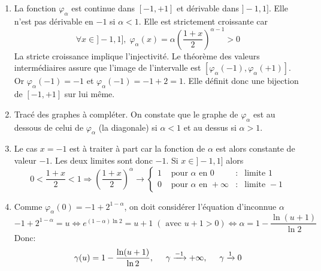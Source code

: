 \begin{enumerate}
  \item La fonction $\varphi_\alpha$ est continue dans $[-1,+1]$ et dérivable dans $]-1,1]$. Elle n'est pas dérivable en $-1$ si $\alpha <1$. Elle est strictement croissante car
\begin{displaymath}
  \forall x\in ]-1,1],\; \varphi_\alpha(x) = \alpha \left( \frac{1+x}{2}\right)^{\alpha -1} > 0
\end{displaymath}
La stricte croissance implique l'injectivité. Le théorème des valeurs intermédiaires assure que l'image de l'intervalle est $[\varphi_\alpha(-1), \varphi_\alpha(+1)]$. Or $\varphi_\alpha(-1)=-1$ et $\varphi_\alpha(-1)=-1+2=1$. Elle définit donc une bijection de $[-1,+1]$ sur lui même.

  \item Tracé des graphes à compléter. On constate que le graphe de $\varphi_\alpha$ est au dessous de celui de $\varphi_\alpha$ (la diagonale) si $\alpha<1$ et au dessus si $\alpha >1$.
  
  \item Le cas $x=-1$ est à traiter à part car la fonction de $\alpha$ est alors constante de valeur $-1$. Les deux limites sont donc $-1$.\newline
Si $x\in ]-1,1]$ alors
\begin{displaymath}
  0<\frac{1+x}{2} < 1 \Rightarrow \left( \frac{1+x}{2}\right)^{\alpha} \rightarrow
\left\lbrace 
\begin{aligned}
  1 &\text{ pour $\alpha$ en } 0       &: &\text{limite } 1\\
  0 &\text{ pour $\alpha$ en } +\infty &: &\text{limite } -1
\end{aligned}
\right. 
\end{displaymath}

  \item Comme $\varphi_\alpha(0)= -1 + 2^{1-\alpha}$, on doit considérer l'équation d'inconnue $\alpha$
\begin{displaymath}
  -1 + 2^{1-\alpha} = u \Leftrightarrow e^{(1-\alpha)\ln 2} = u + 1 \;\left( \text{ avec } u+1>0\right) 
\Leftrightarrow \alpha = 1 - \frac{\ln(u+1)}{\ln 2}
\end{displaymath}
Donc:
\begin{displaymath}
\gamma(u) = 1 - \frac{\ln(u+1)}{\ln 2}, \hspace{0.5cm} \gamma\xrightarrow{-1} +\infty, \hspace{0.5cm} \gamma\xrightarrow{1} 0 
\end{displaymath}

\end{enumerate}
